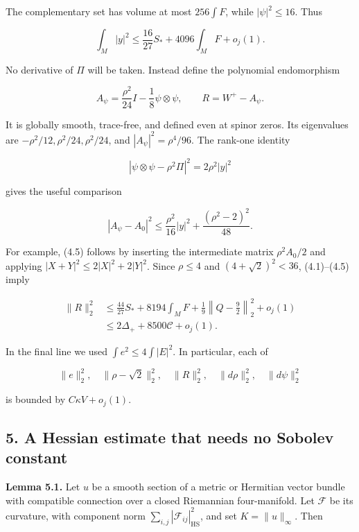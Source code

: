 \documentclass[
  11pt,
]{article}
\begin{document}
The complementary set has volume at most \(256\int F\), while
\(|\psi|^2\le16\). Thus

\[
                 \int_M|y|^2\le\frac{16}{27}S_*+4096\int_MF+o_j(1).
 \tag{4.3}
\]

No derivative of \(\Pi\) will be taken. Instead define the polynomial
endomorphism

\[
       A_\psi=\frac{\rho^2}{24}I-\frac18\psi\otimes\psi,
             \qquad R=W^+-A_\psi.                       \tag{4.4}
\]

It is globally smooth, trace-free, and defined even at spinor zeros. Its
eigenvalues are \(-\rho^2/12,\rho^2/24,\rho^2/24\), and
\(|A_\psi|^2=\rho^4/96\). The rank-one identity

\[
 |\psi\otimes\psi-\rho^2\Pi|^2=2\rho^2|y|^2
\]

gives the useful comparison

\[
 |A_\psi-A_0|^2
       \le\frac{\rho^2}{16}|y|^2+\frac{(\rho^2-2)^2}{48}.
 \tag{4.5}
\]

For example, (4.5) follows by inserting the intermediate matrix
\(\rho^2 A_0/2\) and applying \(|X+Y|^2\le2|X|^2+2|Y|^2\). Since
\(\rho\le4\) and \((4+\sqrt2)^2<36\), (4.1)--(4.5) imply

\[
 \begin{split}
 \|R\|_2^2
 &\le\frac{44}{27}S_*+8194\int_MF
                     +\frac19\left\|Q-\frac92\right\|_2^2+o_j(1)\\
 &\le2\Delta_++8500\mathcal C+o_j(1).
 \end{split}                                              \tag{4.6}
\]

In the final line we used \(\int e^2\le4\int|E|^2\). In particular, each
of

\[
 \|e\|_2^2,\quad\|\rho-\sqrt2\|_2^2,\quad\|R\|_2^2,
            \quad\|d\rho\|_2^2,\quad\|d\psi\|_2^2
\]

is bounded by \(C\kappa V+o_j(1)\).

\hypertarget{a-hessian-estimate-that-needs-no-sobolev-constant}{%
\subsection{5. A Hessian estimate that needs no Sobolev
constant}\label{a-hessian-estimate-that-needs-no-sobolev-constant}}

\textbf{Lemma 5.1.} Let \(u\) be a smooth section of a metric or
Hermitian vector bundle with compatible connection over a closed
Riemannian four-manifold. Let \(\mathscr F\) be its curvature, with
component norm \(\sum_{i,j}|\mathscr F_{ij}|_{\mathrm{HS}}^2\), and set
\(K=\|u\|_\infty\). Then
\end{document}
